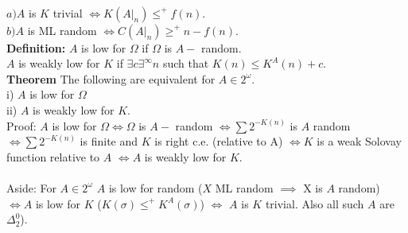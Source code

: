 \documentclass{article}
\begin{document}
      \\ $a) A $ is $K$ trivial $\iff K(A|_n) \leq^+ f(n)$.\\
      $b) A$ is ML random $\iff C(A|_n)\geq^+ n-f(n)$. \\
      \textbf{Definition:} $A$ is low for $\Omega$ if $\Omega$ is $A-$ random.\\
      $A$ is weakly low for $K$ if $\exists c \exists^\infty n $ such that $K(n) \leq K^A(n) + c$.
      \\
      \textbf{Theorem} The following are equivalent for $A\in 2^{\omega}$.\\
      i) $A$ is low for $\Omega$\\
      ii) $A$ is weakly low for $K$.\\
      Proof: $A$ is low for $\Omega \iff \Omega $ is $A-$ random $\iff \sum 2^{-K(n)} $ is $A$ random $\iff \sum 2^{-K(n)} $ is finite and $K$ is right c.e. (relative to A) $\iff K$ is a weak Solovay function relative to $A$ $\iff A$ is weakly low for $K$.\\
      \\ Aside: For $A\in 2^\omega$ $A$ is low for random ($X$ ML random $\implies $ X is $A$ random) $\iff A$ is low for $K$ ($K(\sigma) \leq^+ K^A(\sigma)$) $\iff$ $A$ is $K$ trivial. Also all such $A$ are $\Delta^0_2$).
      \newpage
\end{document}
